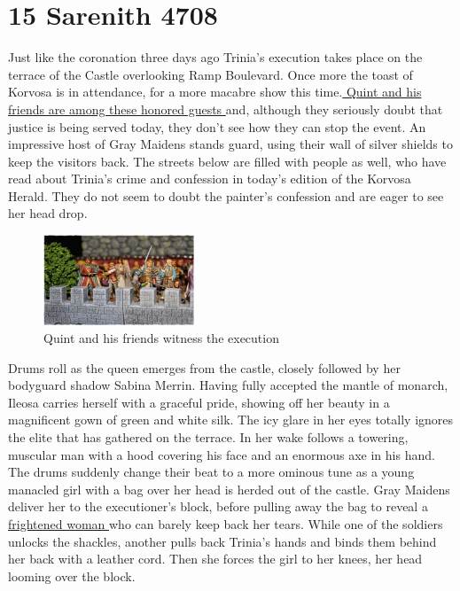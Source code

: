 \section{15 Sarenith 4708}

Just like the coronation three days ago Trinia's execution takes place on the terrace of the Castle overlooking Ramp Boulevard. Once more the toast of Korvosa is in attendance, for a more macabre show this time.\hyperref[fig:Quint-and-his-friends-witness-the-execution-470603218]{ Quint and his friends are among these honored guests } and, although they seriously doubt that justice is being served today, they don't see how they can stop the event. An impressive host of Gray Maidens stands guard, using their wall of silver shields to keep the visitors back. The streets below are filled with people as well, who have read about Trinia's crime and confession in today's edition of the Korvosa Herald. They do not seem to doubt the painter's confession and are eager to see her head drop. \\

\begin{figure}[h]
	\centering
	\includegraphics[width=0.4\textwidth]{images/Quint-and-his-friends-witness-the-execution-470603218_mod.jpg}
	\caption{Quint and his friends witness the execution}
	\label{fig:Quint-and-his-friends-witness-the-execution-470603218}
\end{figure}

Drums roll as the queen emerges from the castle, closely followed by her bodyguard shadow Sabina Merrin. Having fully accepted the mantle of monarch, Ileosa carries herself with a graceful pride, showing off her beauty in a magnificent gown of green and white silk. The icy glare in her eyes totally ignores the elite that has gathered on the terrace. In her wake follows a towering, muscular man with a hood covering his face and an enormous axe in his hand. The drums suddenly change their beat to a more ominous tune as a young manacled girl with a bag over her head is herded out of the castle. Gray Maidens deliver her to the executioner's block, before pulling away the bag to reveal a\hyperref[fig:Trinia-Sabor-facing-the-executioner-470603042]{ frightened woman } who can barely keep back her tears. While one of the soldiers unlocks the shackles, another pulls back Trinia's hands and binds them behind her back with a leather cord. Then she forces the girl to her knees, her head looming over the block. \\

